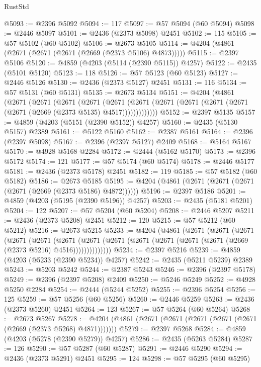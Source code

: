 \begin{lexlean}{RustStd}
\begin{coremodule}
@5093 := @2396 @5092
@5094 := 117
@5097 := @57 @5094 (@60 @5094)
@5098 := @2446 @5097
@5101 := @2436 (@2373 @5098) @2451
@5102 := 115
@5105 := @57 @5102 (@60 @5102)
@5106 := @2673 @5105
@5114 := @4204 (@4861 (@2671 (@2671 (@2671 (@2669 (@2373 @5106) @4873)))))
@5115 := @2397 @5106
@5120 := @4859 (@4203 (@5114 (@2390 @5115)) @4257)
@5122 := @2435 (@5101 @5120)
@5123 := 118
@5126 := @57 @5123 (@60 @5123)
@5127 := @2446 @5126
@5130 := @2436 (@2373 @5127) @2451
@5131 := 116
@5134 := @57 @5131 (@60 @5131)
@5135 := @2673 @5134
@5151 := @4204
    (@4861
      (@2671
        (@2671
          (@2671
            (@2671
              (@2671
                (@2671 (@2671 (@2671 (@2671 (@2671 (@2671 (@2669 (@2373 @5135) @4517)))))))))))))
@5152 := @2397 @5135
@5157 := @4859 (@4203 (@5151 (@2390 @5152)) @4257)
@5160 := @2435 (@5130 @5157) @2389
@5161 := @5122 @5160
@5162 := @2387 @5161
@5164 := @2396 (@2397 @5098)
@5167 := @2396 (@2397 @5127) @2409
@5168 := @5164 @5167
@5170 := @4928 @5168 @2284
@5172 := @2444 (@5162 @5170)
@5173 := @2396 @5172
@5174 := 121
@5177 := @57 @5174 (@60 @5174)
@5178 := @2446 @5177
@5181 := @2436 (@2373 @5178) @2451
@5182 := 119
@5185 := @57 @5182 (@60 @5182)
@5186 := @2673 @5185
@5195 := @4204 (@4861 (@2671 (@2671 (@2671 (@2671 (@2669 (@2373 @5186) @4872))))))
@5196 := @2397 @5186
@5201 := @4859 (@4203 (@5195 (@2390 @5196)) @4257)
@5203 := @2435 (@5181 @5201)
@5204 := 122
@5207 := @57 @5204 (@60 @5204)
@5208 := @2446 @5207
@5211 := @2436 (@2373 @5208) @2451
@5212 := 120
@5215 := @57 @5212 (@60 @5212)
@5216 := @2673 @5215
@5233 := @4204
    (@4861
      (@2671
        (@2671
          (@2671
            (@2671
              (@2671
                (@2671
                  (@2671 (@2671 (@2671 (@2671 (@2671 (@2671 (@2669 (@2373 @5216) @4516))))))))))))))
@5234 := @2397 @5216
@5239 := @4859 (@4203 (@5233 (@2390 @5234)) @4257)
@5242 := @2435 (@5211 @5239) @2389
@5243 := @5203 @5242
@5244 := @2387 @5243
@5246 := @2396 (@2397 @5178)
@5249 := @2396 (@2397 @5208) @2409
@5250 := @5246 @5249
@5252 := @4928 @5250 @2284
@5254 := @2444 (@5244 @5252)
@5255 := @2396 @5254
@5256 := 125
@5259 := @57 @5256 (@60 @5256)
@5260 := @2446 @5259
@5263 := @2436 (@2373 @5260) @2451
@5264 := 123
@5267 := @57 @5264 (@60 @5264)
@5268 := @2673 @5267
@5278 := @4204 (@4861 (@2671 (@2671 (@2671 (@2671 (@2671 (@2669 (@2373 @5268) @4871)))))))
@5279 := @2397 @5268
@5284 := @4859 (@4203 (@5278 (@2390 @5279)) @4257)
@5286 := @2435 (@5263 @5284)
@5287 := 126
@5290 := @57 @5287 (@60 @5287)
@5291 := @2446 @5290
@5294 := @2436 (@2373 @5291) @2451
@5295 := 124
@5298 := @57 @5295 (@60 @5295)

\end{coremodule}
\end{lexlean}
